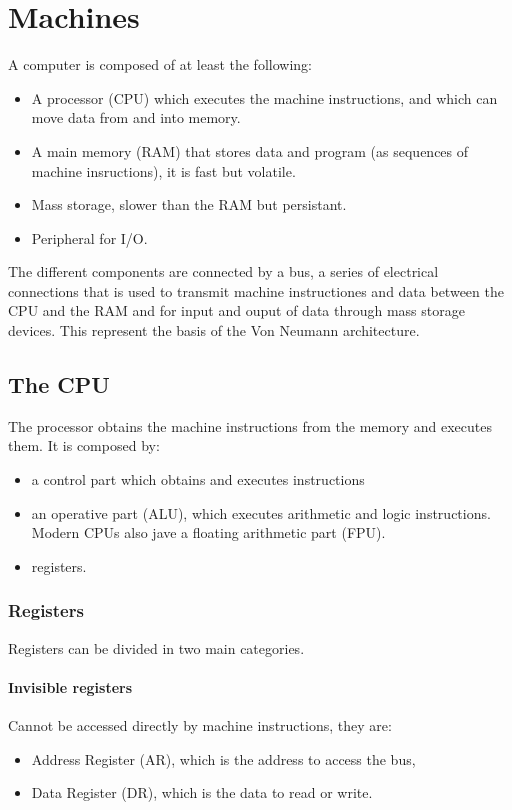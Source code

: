 \chapter{Machines}
A computer is composed of at least the following:
\begin{itemize}
\item A processor (CPU) which executes the machine instructions, and which can move data from and into memory.
\item A main memory (RAM) that stores data and program (as sequences of machine insructions), it is fast but volatile.
\item Mass storage, slower than the RAM but persistant.
\item Peripheral for I/O.
\end{itemize}
The different components are connected by a bus, a series of electrical connections that is used to transmit machine instructiones and data between the CPU and the RAM and for input
and ouput of data through mass storage devices. This represent the basis of the Von Neumann architecture.
\section{The CPU}
The processor obtains the machine instructions from the memory and executes them. It is composed by:
\begin{itemize}
\item a control part which obtains and executes instructions
\item an operative part  (ALU), which executes arithmetic and logic instructions. Modern CPUs also jave a floating arithmetic part (FPU).
\item registers.
\end{itemize}
\subsection{Registers}
Registers can be divided in two main categories. 
\subsubsection{Invisible registers}
Cannot be accessed directly by machine instructions, they are:
\begin{itemize}
\item Address Register (AR), which is the address to access the bus,
\item Data Register (DR), which is the data to read or write.
\end{itemize}
